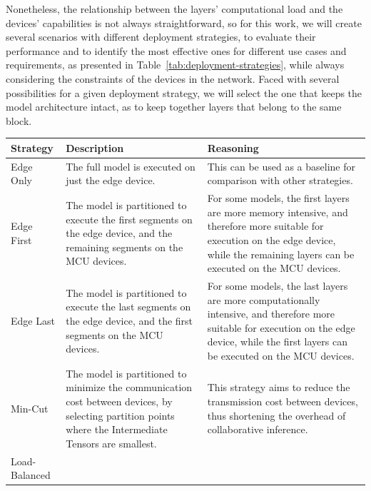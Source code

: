 Nonetheless, the relationship between the layers' computational load and the devices' 
capabilities is not always straightforward, so for this work, we will create several
scenarios with different deployment strategies, to evaluate their performance and to
identify the most effective ones for different use cases and requirements, as presented
in Table~\ref{tab:deployment-strategies}, while always considering the constraints
of the devices in the network. Faced with several possibilities for a given deployment
strategy, we will select the one that keeps the model architecture intact, as to keep
together layers that belong to the same block.

\begin{table}[H]
  \centering
  \small
  \setlength{\tabcolsep}{6pt}
  \renewcommand{\arraystretch}{1.2}
  \begin{tabularx}{0.95\textwidth}{|m{3.22cm}|X|X|}
    \hline
    \textbf{Strategy} & \textbf{Description} & \textbf{Reasoning}\\
    \hline
    Edge Only 
        & 
      The full model is executed on just the edge device. 
        &
      This can be used as a baseline for comparison with other strategies. 
      \\
    \hline
    Edge First 
        &
      The model is partitioned to execute the first segments on the edge device, and
        the remaining segments on the \ac{MCU} devices. 
        &
      For some models, the first layers are more memory intensive, and therefore more
        suitable for execution on the edge device, while the remaining layers can be
        executed on the \ac{MCU} devices. 
      \\
    \hline
    Edge Last 
        & 
      The model is partitioned to execute the last segments on the edge device, and
        the first segments on the \ac{MCU} devices. 
        &
      For some models, the last layers are more computationally intensive, and
        therefore more suitable for execution on the edge device, while the first layers
        can be executed on the \ac{MCU} devices.
      \\
    \hline
    Min-Cut 
      & 
      The model is partitioned to minimize the communication cost between devices,
        by selecting partition points where the Intermediate Tensors are smallest. 
      &
      This strategy aims to reduce the transmission cost between devices, thus 
      shortening the overhead of collaborative inference.  
      \\
    \hline
    Load-Balanced 

\end{tabularx}
\end{table}
